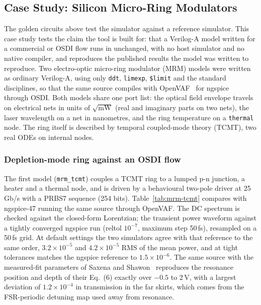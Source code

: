 \subsection{Case Study: Silicon Micro-Ring Modulators}
\label{sec:mrm}

The golden circuits above test the simulator against a reference simulator. This case study
tests the claim the tool is built for: that a Verilog-A model written for a commercial or OSDI
flow runs in \vas{} unchanged, with no host simulator and no native compiler, and reproduces the
published results the model was written to reproduce. Two electro-optic micro-ring modulator
(MRM) models were written as ordinary Verilog-A, using only \texttt{ddt}, \texttt{limexp},
\texttt{\$limit} and the standard disciplines, so that the same source compiles with
OpenVAF~\cite{openvaf} for ngspice~\cite{ngspice} through OSDI. Both models share one port list:
the optical field envelope travels on electrical nets in units of $\sqrt{\text{mW}}$ (real and
imaginary parts on two nets), the laser wavelength on a net in nanometres, and the ring
temperature on a \texttt{thermal} node. The ring itself is described by temporal coupled-mode
theory (TCMT), two real ODEs on internal nodes.

\subsubsection{Depletion-mode ring against an OSDI flow}
The first model (\texttt{mrm\_tcmt}) couples a TCMT ring to a lumped p-n junction, a heater and
a thermal node, and is driven by a behavioural two-pole driver at 25\,Gb/s with a PRBS7 sequence
(254 bits). Table~\ref{tab:mrm-tcmt} compares \vas{} with ngspice-47 running the same source
through OpenVAF. The DC spectrum is checked against the closed-form Lorentzian; the transient
power waveform against a tightly converged ngspice run (reltol $10^{-7}$, maximum step 50\,fs),
resampled on a 50\,fs grid. At default settings the two simulators agree with that reference
to the same order, $3.2\times10^{-5}$ and $4.2\times10^{-5}$ RMS of the mean power, and \vas{}
at tight tolerances matches the ngspice reference to $1.5\times10^{-6}$. The same source with
the measured-fit parameters of Saxena and Shawon~\cite{saxena2023mdm} reproduces the resonance
position and depth of their Eq.~(6) exactly over $-0.5$ to 2\,V, with a largest deviation of
$1.2\times10^{-4}$ in transmission in the far skirts, which comes from the FSR-periodic detuning
map used away from resonance.

